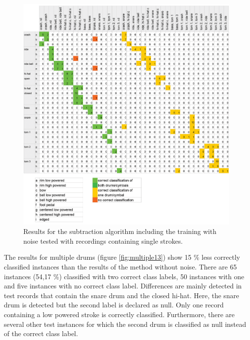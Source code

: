 \begin{figure}[htbp]
	\centering
	\includegraphics[width=\textwidth]{images/classification_matrix/multiple1_test_2_single.png}
	\caption{Results for the subtraction algorithm including the training with noise tested with recordings containing single strokes.}
	\label{fig:multiple12}
\end{figure}

The results for multiple drums (figure \ref{fig:multiple13}) show 15 \% less correctly classified instances than the results of the method without noise. There are 65 instances (54,17 \%) classified with two correct class labels, 50 instances with one and five instances with no correct class label. Differences are mainly detected in test records that contain the snare drum and the closed hi-hat. Here, the snare drum is detected but the second label is declared as null. Only one record containing a low powered stroke is correctly classified. Furthermore, there are several other test instances for which the second drum is classified as null instead of the correct class label.

